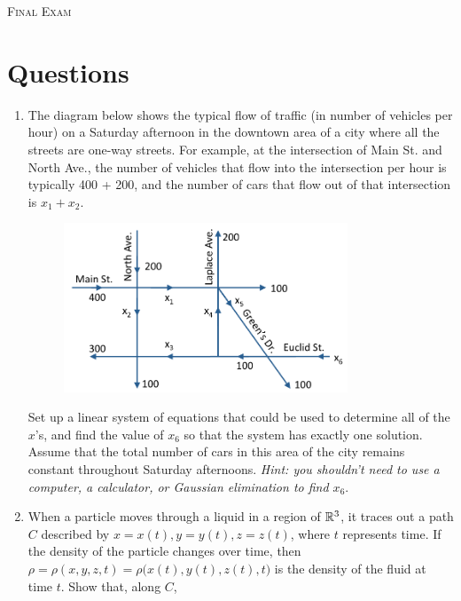 \documentclass{article}
\date{}
\begin{document}
\begin{center}
\textsc{\LARGE Final Exam}\\[0.5cm]
\end{center}
\section*{Questions}

\begin{enumerate}
\item %
The diagram below shows the typical flow of traffic (in number of vehicles per hour) on a Saturday afternoon in the downtown area of a city where all the streets are one-way streets. For example, at the intersection of Main St. and North Ave., the number of vehicles that flow into the intersection per hour is typically 400 + 200, and the number of cars that flow out of that intersection is $x_1+x_2$. 
\begin{figure}[H]
  \vspace{-5pt}
  \begin{center}
    \includegraphics[width=0.8\textwidth]{Traffic.png}
  \end{center}
  \vspace{-20pt}
\end{figure}
Set up a linear system of equations that could be used to determine all of the $x$'s, and find the value of $x_6$ so that the system has exactly one solution. Assume that the total number of cars in this area of the city remains constant throughout Saturday afternoons. \textit{Hint: you shouldn't need to use a computer, a calculator, or Gaussian elimination to find $x_6$}.
\item %
When a particle moves through a liquid in a region of $\mathbb{R}^3$, it traces out a path $C$ described by $x=x(t), y=y(t), z=z(t)$, where $t$ represents time. If the density of the particle changes over time, then $\rho=\rho(x,y,z,t)=\rho\big(x(t),y(t),z(t),t\big)$ is the density of the fluid at time $t$. Show that, along $C$,

\end{enumerate}
\end{document}
